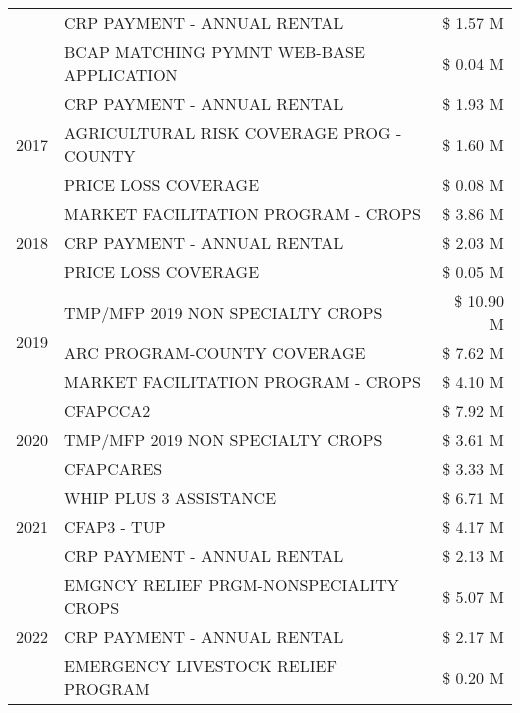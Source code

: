 \begin{tabular}{llr}
 & CRP PAYMENT - ANNUAL RENTAL & \$ 1.57 M \\
 & BCAP MATCHING PYMNT WEB-BASE APPLICATION & \$ 0.04 M \\
\cline{1-3}
\multirow[t]{3}{*}{2017} & CRP PAYMENT - ANNUAL RENTAL & \$ 1.93 M \\
 & AGRICULTURAL RISK COVERAGE PROG - COUNTY & \$ 1.60 M \\
 & PRICE LOSS COVERAGE & \$ 0.08 M \\
\cline{1-3}
\multirow[t]{3}{*}{2018} & MARKET FACILITATION PROGRAM - CROPS & \$ 3.86 M \\
 & CRP PAYMENT - ANNUAL RENTAL & \$ 2.03 M \\
 & PRICE LOSS COVERAGE & \$ 0.05 M \\
\cline{1-3}
\multirow[t]{3}{*}{2019} & TMP/MFP 2019 NON SPECIALTY CROPS & \$ 10.90 M \\
 & ARC PROGRAM-COUNTY COVERAGE & \$ 7.62 M \\
 & MARKET FACILITATION PROGRAM - CROPS & \$ 4.10 M \\
\cline{1-3}
\multirow[t]{3}{*}{2020} & CFAPCCA2 & \$ 7.92 M \\
 & TMP/MFP 2019 NON SPECIALTY CROPS & \$ 3.61 M \\
 & CFAPCARES & \$ 3.33 M \\
\cline{1-3}
\multirow[t]{3}{*}{2021} & WHIP PLUS 3 ASSISTANCE & \$ 6.71 M \\
 & CFAP3 - TUP & \$ 4.17 M \\
 & CRP PAYMENT - ANNUAL RENTAL & \$ 2.13 M \\
\cline{1-3}
\multirow[t]{3}{*}{2022} & EMGNCY RELIEF PRGM-NONSPECIALITY CROPS & \$ 5.07 M \\
 & CRP PAYMENT - ANNUAL RENTAL & \$ 2.17 M \\
 & EMERGENCY LIVESTOCK RELIEF PROGRAM & \$ 0.20 M \\
\cline{1-3}
\bottomrule
\end{tabular}
